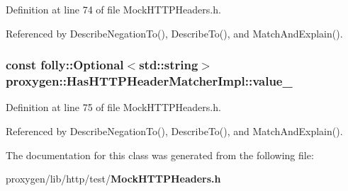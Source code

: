 Definition at line 74 of file Mock\+H\+T\+T\+P\+Headers.\+h.



Referenced by Describe\+Negation\+To(), Describe\+To(), and Match\+And\+Explain().

\subsubsection[{value\+\_\+}]{\setlength{\rightskip}{0pt plus 5cm}const folly\+::\+Optional$<$std\+::string$>$ proxygen\+::\+Has\+H\+T\+T\+P\+Header\+Matcher\+Impl\+::value\+\_\+\hspace{0.3cm}{\ttfamily [private]}}\label{classproxygen_1_1HasHTTPHeaderMatcherImpl_a45d12dc6ae99af111ebd4e02d9386426}


Definition at line 75 of file Mock\+H\+T\+T\+P\+Headers.\+h.



Referenced by Describe\+Negation\+To(), Describe\+To(), and Match\+And\+Explain().



The documentation for this class was generated from the following file\+:\begin{DoxyCompactItemize}
\item 
proxygen/lib/http/test/{\bf Mock\+H\+T\+T\+P\+Headers.\+h}\end{DoxyCompactItemize}
